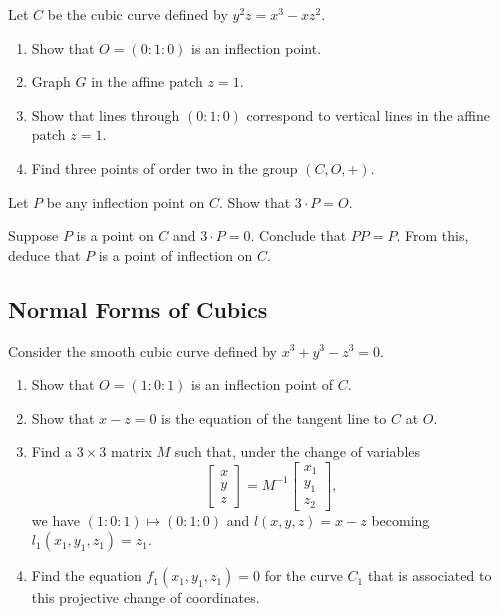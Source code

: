 \begin{tcolorbox}[title=Problem 16, breakable]
    Let $C$ be the cubic curve defined by $y^2 z = x^3 - x z^2$.
    \begin{enumerate}
        \item Show that $O = (0 : 1 : 0)$ is an inflection point.
        \item Graph $G$ in the affine patch $z = 1$.
        \item Show that lines through $(0 : 1 : 0)$ correspond to vertical lines in the affine patch $z = 1$.
        \item Find three points of order two in the group $(C, O, +)$.
    \end{enumerate}
\end{tcolorbox}

\begin{tcolorbox}[title=Problem 17, breakable]
    Let $P$ be any inflection point on $C$. Show that $3 \cdot P = O$.
\end{tcolorbox}

\begin{tcolorbox}[title=Problem 18, breakable]
    Suppose $P$ is a point on $C$ and $3 \cdot P = 0$.
    Conclude that $P P = P$. From this, deduce that $P$ is a point of inflection on $C$.
\end{tcolorbox}

\subsection{Normal Forms of Cubics}

\begin{tcolorbox}[title=Problem 1, breakable]
    Consider the smooth cubic curve defined by 
    $x^3 + y^3 - z^3 = 0$.
    \begin{enumerate}
        \item Show that $O = (1 : 0 : 1)$ is an inflection point of $C$.
        \item Show that $x - z = 0$ is the equation of the tangent line to $C$ at $O$.
        \item Find a $3 \times 3$ matrix $M$ such that, under the change of variables 
        \[
        \begin{bmatrix}
            x \\ y \\ z
        \end{bmatrix}
        =
        M^{-1}
        \begin{bmatrix}
            x_1 \\ y_1 \\ z_2
        \end{bmatrix},
        \]
        we have $(1 : 0 : 1) \mapsto (0 : 1 : 0)$
        and $l(x, y, z) = x - z$ becoming $l_1(x_1, y_1, z_1) = z_1$.
        \item Find the equation $f_1(x_1, y_1, z_1) = 0$ for the curve $C_1$ that is associated to this projective change of coordinates.
    \end{enumerate}
\end{tcolorbox}

